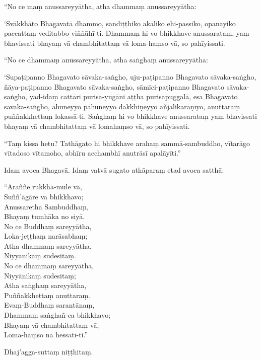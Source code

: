 “No ce maṃ anussareyyātha, atha dhammaṃ anussareyyātha:

‘Svākkhāto Bhagavatā dhammo, sandiṭṭhiko akāliko ehi-passiko, opanayiko
paccattaṃ veditabbo viññūhī-ti. Dhammaṃ hi vo bhikkhave anussarataṃ, yaṃ
bhavissati bhayaṃ vā chambhitattaṃ vā loma-haṃso vā, so pahīyissati.

“No ce dhammaṃ anussareyyātha, atha saṅghaṃ anussareyyātha:

‘Supaṭipanno Bhagavato sāvaka-saṅgho, uju-paṭipanno Bhagavato sāvaka-saṅgho,
ñāya-paṭipanno Bhagavato sāvaka-saṅgho, sāmīci-paṭipanno Bhagavato
sāvaka-saṅgho, yad-idaṃ cattāri purisa-yugāni aṭṭha purisapuggalā, esa Bhagavato
sāvaka-saṅgho, āhuneyyo pāhuneyyo dakkhiṇeyyo añjalikaraṇīyo, anuttaraṃ
puññakkhettaṃ lokassā-ti. Saṅghaṃ hi vo bhikkhave anussarataṃ yaṃ bhavissati
bhayaṃ vā chambhitattaṃ vā lomahaṃso vā, so pahīyissati.

“Taṃ kissa hetu? Tathāgato hi bhikkhave arahaṃ sammā-sambuddho, vītarāgo
vītadoso vītamoho, abhīru acchambhī anutrāsī apalāyīti.”

Idam avoca Bhagavā. Idaṃ vatvā sugato athāparaṃ etad avoca satthā:

“Araññe rukkha-mūle vā,\\
Suññ’āgāre va bhikkhavo;\\
Anussaretha Sambuddhaṃ,\\
Bhayaṃ tumhāka no siyā.\\
No ce Buddhaṃ sareyyātha,\\
Loka-jeṭṭhaṃ narāsabhaṃ;\\
Atha dhammaṃ sareyyātha,\\
Niyyānikaṃ sudesitaṃ.\\
No ce dhammaṃ sareyyātha,\\
Niyyānikaṃ sudesitaṃ;\\
Atha saṅghaṃ sareyyātha,\\
Puññakkhettaṃ anuttaraṃ.\\
Evaṃ-Buddhaṃ sarantānaṃ,\\
Dhammaṃ saṅghañ-ca bhikkhavo;\\
Bhayaṃ vā chambhitattaṃ vā,\\
Loma-haṃso na hessatī-ti.”

Dhaj’agga-suttaṃ niṭṭhitaṃ.


